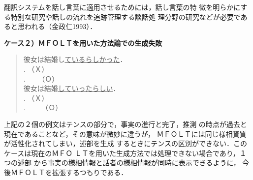 翻訳システムを話し言葉に適用させるためには，話し言葉の特
徴を明らかにする特別な研究や話しの流れを追跡管理する談話処
理分野の研究などが必要であると思われる（金政仁1993）．

\vspace{5mm}
\noindent
{\bf ケース２）ＭＦＯＬＴを用いた方法論での生成失敗}
\hspace*{4mm}
\begin{quote}
彼女は結婚し\underline{ているらしかった}．\\
\underline{}.  （Ｘ）\\
\underline{}. \ \ \ （Ｏ）\\
彼女は結婚\underline{していったらしい}．\\
\underline{}.  （Ｘ）\\
\underline{}. \ \ \ \ （Ｏ）
\end{quote}
\vspace{5mm}

上記の２個の例文はテンスの部分で，事実の進行と完了，推測
の時点が過去と現在であることなど，その意味が微妙に違うが，
ＭＦＯＬＴには同じ様相資質が活性化されてしまい，述部を生成
するときにテンスの区別ができない．このケースは現在のＭＦＯ
ＬＴを用いた生成方法では処理できない場合であり，１つの述部
から事実の様相情報と話者の様相情報が同時に表示できるように，
今後ＭＦＯＬＴを拡張するつもりである．

